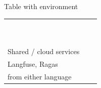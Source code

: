\begin{simpleCenteringTempChapterTable}{Table with environment}
	\def\cellSharedA{Shared / cloud services}
	\def\cellSharedB{\makecell[l]{OpenAI, Anthropic, Promptfoo, \\ Langfuse, Ragas }}
	\def\cellSharedC{\makecell[l]{Same; consumed via HTTP/SDKs \\  from either language }}

	\begin{tabular}{|l|l|l|} \hline
		\cellLayer & \cellPy & \cellJs \\ \hline
		\cellApiA & \cellApiB & \cellApiC \\ \hline
		\cellDbA & \cellDbB & \cellDbC \\ \hline
		\cellRubricA & \cellRubricB & \cellRubricC \\ \hline
		\cellLlmA & \cellLlmB & \cellLlmC \\ \hline
		\cellStructA & \cellStructB & \cellStructC \\ \hline
		\cellTestA & \cellTestB & \cellTestC \\ \hline
		\cellObsA & \cellObsB & \cellObsC \\ \hline
		\cellMetricA & \cellMetricB & \cellMetricC \\ \hline
		\cellDashboardA & \cellDashboardB & \cellDashboardC \\ \hline
		\cellUploadA & \cellUploadB & \cellUploadC \\ \hline
		\cellSharedA & \cellSharedB & \cellSharedC \\ \hline
	\end{tabular}
\end{simpleCenteringTempChapterTable}